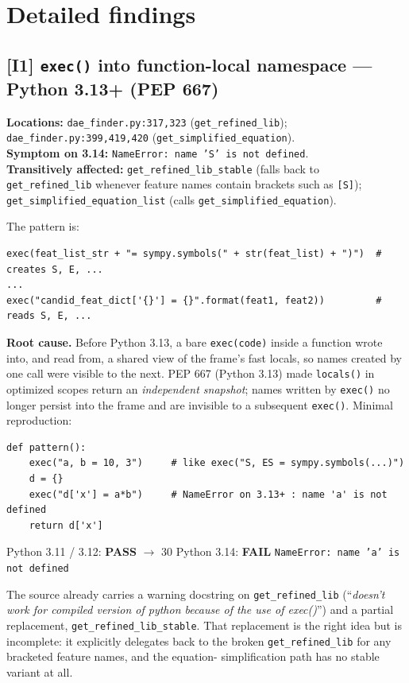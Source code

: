 \documentclass[11pt]{article}
\newcommand{\code}[1]{\texttt{\small #1}}
\newcommand{\PASS}{\textcolor{pass}{\textbf{PASS}}}
\newcommand{\FAIL}{\textcolor{fail}{\textbf{FAIL}}}
\begin{document}
\section{Detailed findings}

\subsection*{[I1] \code{exec()} into function-local namespace --- Python 3.13+ (PEP 667)}

\textbf{Locations:} \code{dae\_finder.py:317,323} (\code{get\_refined\_lib});
\code{dae\_finder.py:399,419,420} (\code{get\_simplified\_equation}).\\
\textbf{Symptom on 3.14:} \code{NameError: name 'S' is not defined}.\\
\textbf{Transitively affected:} \code{get\_refined\_lib\_stable} (falls back to
\code{get\_refined\_lib} whenever feature names contain brackets such as
\code{[S]}); \code{get\_simplified\_equation\_list} (calls
\code{get\_simplified\_equation}).

The pattern is:
\begin{lstlisting}
exec(feat_list_str + "= sympy.symbols(" + str(feat_list) + ")")  # creates S, E, ...
...
exec("candid_feat_dict['{}'] = {}".format(feat1, feat2))         # reads S, E, ...
\end{lstlisting}

\textbf{Root cause.} Before Python 3.13, a bare \code{exec(code)} inside a function
wrote into, and read from, a shared view of the frame's fast locals, so names
created by one call were visible to the next. PEP 667 (Python 3.13) made
\code{locals()} in optimized scopes return an \emph{independent snapshot}; names
written by \code{exec()} no longer persist into the frame and are invisible to a
subsequent \code{exec()}. Minimal reproduction:

\begin{lstlisting}
def pattern():
    exec("a, b = 10, 3")     # like exec("S, ES = sympy.symbols(...)")
    d = {}
    exec("d['x'] = a*b")     # NameError on 3.13+ : name 'a' is not defined
    return d['x']
\end{lstlisting}

\begin{center}\small
Python 3.11 / 3.12: \PASS{} $\to$ 30 \qquad Python 3.14: \FAIL{} \code{NameError: name 'a' is not defined}
\end{center}

The source already carries a warning docstring on \code{get\_refined\_lib}
(``\emph{doesn't work for compiled version of python because of the use of exec()}'')
and a partial replacement, \code{get\_refined\_lib\_stable}. That replacement is
the right idea but is incomplete: it explicitly delegates back to the broken
\code{get\_refined\_lib} for any bracketed feature names, and the equation-
simplification path has no stable variant at all.
\end{document}
